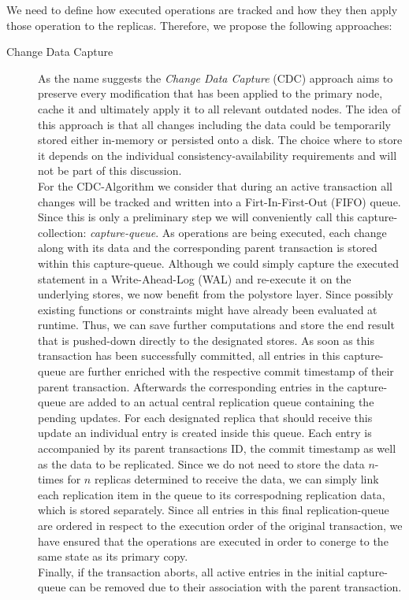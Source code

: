 We need to define how executed operations are tracked and how they then apply those operation to the replicas. 
Therefore, we propose the following approaches: \\

\begin{description}
    \item [Change Data Capture]
     As the name suggests the \emph{Change Data Capture} (CDC) approach aims to preserve every modification that has been applied to the primary node, cache it and ultimately
    apply it to all relevant outdated nodes. 
    The idea of this approach is that all changes including the data could be temporarily stored either in-memory or persisted onto a disk.
    The choice where to store it depends on the individual consistency-availability requirements and will not be part of this discussion.\\
    For the CDC-Algorithm we consider that during an active transaction all changes will be tracked and written into a Firt-In-First-Out (FIFO) queue.
    Since this is only a preliminary step we will conveniently call this capture-collection: \emph{capture-queue}.
    As operations are being executed, each change along with its data and the corresponding parent transaction is stored within this capture-queue.
    Although we could simply capture the executed statement in a Write-Ahead-Log (WAL) and re-execute it on the underlying stores, we now benefit from the polystore layer.
    Since possibly existing functions or constraints might have already been evaluated at runtime. Thus, we can save further computations and store the end result that is pushed-down directly
    to the designated stores. As soon as this transaction has been successfully committed, all entries in this capture-queue are further enriched with the respective commit timestamp of their parent transaction.
    Afterwards the corresponding entries in the capture-queue are added to an actual central replication queue containing the pending updates.
    For each designated replica that should receive this update an individual entry is created inside this queue. 
    Each entry is accompanied by its parent transactions ID, the commit timestamp as well as the data to be replicated.
    Since we do not need to store the data $n$-times for $n$ replicas determined to receive the data, we can simply link each replication item in the queue to its 
    correspodning replication data, which is stored separately. 
    Since all entries in this final replication-queue are ordered in respect to the execution order of the original transaction,
    we have ensured that the operations are executed in order to conerge to the same state as its primary copy.\\ 
    Finally, if the transaction aborts, all active entries in the initial capture-queue can be removed due to their association with the parent transaction.\\
    

\end{description}
